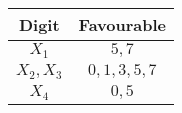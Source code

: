 
\begin{center}
    \begin{tabular}{|c|c|}
    \hline
	    \textbf{Digit}& \textbf{Favourable} \\ \hline
	    $X_{1}$ 		   & 	$5,7$	\\ \hline
	    $X_{2},X_{3}$ 		   & 	$0,1,3,5,7$ \\ \hline
	    $X_{4}$ 		   & 	$0,5$ \\ \hline

    \end{tabular}
    \end{center}
